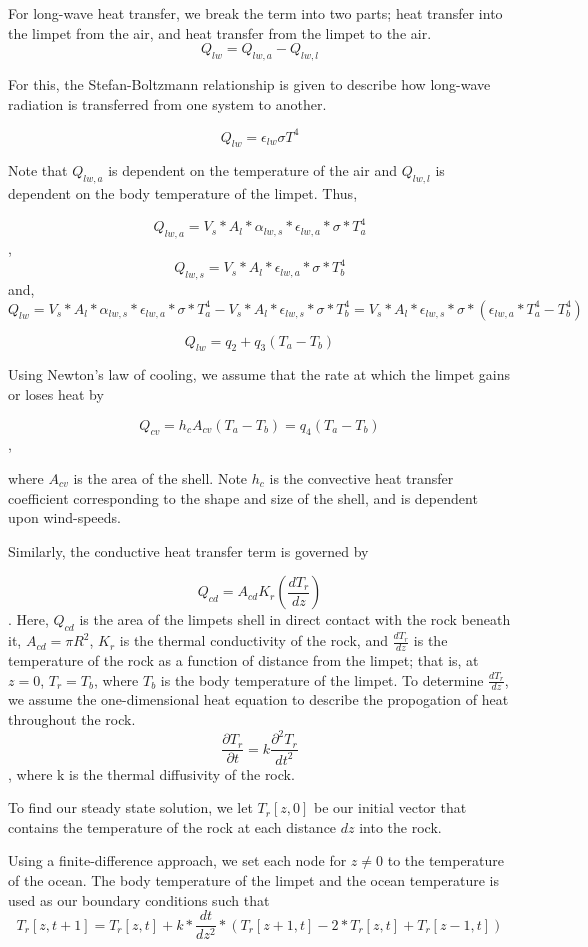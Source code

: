 \documentclass{article}
\begin{document}
For long-wave heat transfer, we break the term into two parts; heat transfer into the limpet from the air, and heat transfer from the limpet to the air. 
$$Q_{lw} = Q_{lw,a} - Q_{lw,l}$$

For this, the Stefan-Boltzmann relationship is given to describe how long-wave radiation is transferred from one system to another.

$$Q_{lw} = \epsilon_{lw} \sigma T^4$$

Note that $Q_{lw,a}$ is dependent on the temperature of the air and $Q_{lw,l}$ is dependent on the body temperature of the limpet. Thus,

$$Q_{lw,a} =V_s*A_l*\alpha_{lw,s}*\epsilon_{lw,a}*\sigma*T_a^4$$, $$Q_{lw,s} =V_s*A_l*\epsilon_{lw,a}*\sigma*T_b^4$$ and,
$$Q_{lw} = V_s*A_l*\alpha_{lw,s}*\epsilon_{lw,a}*\sigma*T_a^4 - V_s*A_l*\epsilon_{lw,s}*\sigma*T_b^4 = V_s*A_l*\epsilon_{lw,s}*\sigma*(\epsilon_{lw,a}*T_a^4 - T_b^4)$$

$$Q_{lw} = q_2 + q_3(T_a-T_b)$$

Using Newton's law of cooling, we assume that the rate at which the limpet gains or loses heat by

$$Q_{cv} = h_c A_{cv} (T_a - T_b) = q_4(T_a - T_b)$$,

where $A_{cv}$ is the area of the shell. Note $h_c$ is the convective heat transfer coefficient corresponding to the shape and size of the shell, and is dependent upon wind-speeds.

Similarly, the conductive heat transfer term is governed by

$$Q_{cd} = A_{cd} K_r (\frac{dT_r}{dz})$$.
Here, $Q_{cd}$ is the area of the limpets shell in direct contact with the rock beneath it, $A_{cd} = \pi R^2$, $K_r$ is the thermal conductivity of the rock, and $\frac{dT_r}{dz}$ is the temperature of the rock as a function of distance from the limpet; that is, at $z = 0$, $T_r = T_b$, where $T_b$ is the body temperature of the limpet. To determine $\frac{dT_r}{dz}$, we assume the one-dimensional heat equation to describe the propogation of heat throughout the rock. 
$$\frac{\partial T_r}{\partial t} = k \frac{\partial^2 T_r}{dt^2}$$,  
where k is the thermal diffusivity of the rock.

To find our steady state solution, we let $T_r[z,0]$ be our initial vector  that contains the temperature of the rock at each distance $dz$ into the rock.

Using a finite-difference approach, we set each node for $z \neq 0$ to the temperature of the ocean. The body temperature of the limpet and the ocean temperature is used as our boundary conditions such that $$T_r[z,t+1] = T_r[z,t] + k*\frac{dt}{dz^2}*(T_r[z+1,t] - 2*T_r[z,t] + T_r[z-1,t])$$ 
\end{document}

